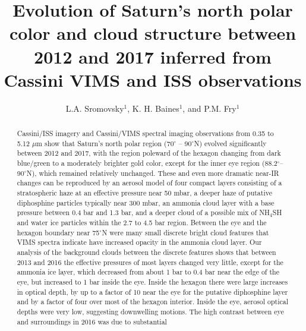 \documentclass[article,11pt]{emulateapj}
\def\degx{$^\circ$}
\def\mum{$\mu$m }
\def\nhfsh{NH$_4$SH }
\begin{document}
\title{Evolution of Saturn's north polar color and cloud structure 
  between 2012 and 2017 inferred from Cassini VIMS and ISS observations}
\author{L.A. Sromovsky$^1$, K. H. Baines$^1$, and P.M. Fry$^1$}


\begin{abstract}

Cassini/ISS imagery and Cassini/VIMS spectral imaging observations
from 0.35 to 5.12 \mum show that Saturn's north polar region (70\degx
-- 90\degx N) evolved significantly between 2012 and 2017, with the
region poleward of the hexagon changing from dark blue/green to a
moderately brighter gold color, except for the inner eye region
(88.2\degx -- 90\degx N), which remained relatively unchanged.  These
and even more dramatic near-IR changes can be reproduced by an aerosol
model of four compact layers consisting of a stratospheric haze at an
effective pressure near 50 mbar, a deeper haze of putative diphosphine
particles typically near 300 mbar, an ammonia cloud layer with a base pressure
between 0.4 bar and 1.3 bar, and a deeper cloud of a possible mix of
\nhfsh and water ice particles within the 2.7 to 4.5 bar region.
Between the eye and the hexagon boundary near 75\degx N were many
small discrete bright cloud features that VIMS spectra indicate have
increased opacity in the ammonia cloud layer.  Our analysis of the
background clouds between the discrete features shows that between
2013 and 2016 the effective pressures of most layers changed
very little, except for the ammonia ice layer, which decreased from
about 1 bar to 0.4 bar near the edge of the eye, but increased to 1
bar inside the eye. Inside the hexagon there were large increases in
optical depth, by up to a factor of 10 near the eye for the putative diphosphine
layer and by a factor of four over most of the hexagon
interior.  Inside the eye, aerosol optical depths were very low,
suggesting downwelling motions.  The high contrast between eye and
surroundings in 2016 was due to substantial

\end{abstract}
\end{document}

